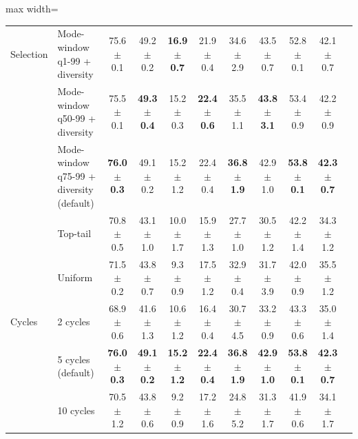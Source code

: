 \begin{table}[t]
\begin{adjustbox}{max width=\textwidth}
\begin{tabular}{l l c c c c c c c c c}
\midrule
Selection & Mode-window q1-99 + diversity & 75.6 {\scriptsize$\pm$ 0.1} & 49.2 {\scriptsize$\pm$ 0.2} & \textbf{16.9 {\scriptsize$\pm$ 0.7}} & 21.9 {\scriptsize$\pm$ 0.4} & 34.6 {\scriptsize$\pm$ 2.9} & 43.5 {\scriptsize$\pm$ 0.7} & 52.8 {\scriptsize$\pm$ 0.1} & 42.1 {\scriptsize$\pm$ 0.7} \\
 & Mode-window q50-99 + diversity & 75.5 {\scriptsize$\pm$ 0.1} & \textbf{49.3 {\scriptsize$\pm$ 0.4}} & 15.2 {\scriptsize$\pm$ 0.3} & \textbf{22.4 {\scriptsize$\pm$ 0.6}} & 35.5 {\scriptsize$\pm$ 1.1} & \textbf{43.8 {\scriptsize$\pm$ 3.1}} & 53.4 {\scriptsize$\pm$ 0.9} & 42.2 {\scriptsize$\pm$ 0.9} \\
 & \rowcolor{blue!10} Mode-window q75-99 + diversity (default) & \textbf{76.0 {\scriptsize$\pm$ 0.3}} & 49.1 {\scriptsize$\pm$ 0.2} & 15.2 {\scriptsize$\pm$ 1.2} & 22.4 {\scriptsize$\pm$ 0.4} & \textbf{36.8 {\scriptsize$\pm$ 1.9}} & 42.9 {\scriptsize$\pm$ 1.0} & \textbf{53.8 {\scriptsize$\pm$ 0.1}} & \textbf{42.3 {\scriptsize$\pm$ 0.7}} \\
 & Top-tail & 70.8 {\scriptsize$\pm$ 0.5} & 43.1 {\scriptsize$\pm$ 1.0} & 10.0 {\scriptsize$\pm$ 1.7} & 15.9 {\scriptsize$\pm$ 1.3} & 27.7 {\scriptsize$\pm$ 1.0} & 30.5 {\scriptsize$\pm$ 1.2} & 42.2 {\scriptsize$\pm$ 1.4} & 34.3 {\scriptsize$\pm$ 1.2} \\
 & Uniform & 71.5 {\scriptsize$\pm$ 0.2} & 43.8 {\scriptsize$\pm$ 0.7} & 9.3 {\scriptsize$\pm$ 0.9} & 17.5 {\scriptsize$\pm$ 1.2} & 32.9 {\scriptsize$\pm$ 0.4} & 31.7 {\scriptsize$\pm$ 3.9} & 42.0 {\scriptsize$\pm$ 0.9} & 35.5 {\scriptsize$\pm$ 1.2} \\
\midrule
Cycles & 2 cycles & 68.9 {\scriptsize$\pm$ 0.6} & 41.6 {\scriptsize$\pm$ 1.3} & 10.6 {\scriptsize$\pm$ 1.2} & 16.4 {\scriptsize$\pm$ 0.4} & 30.7 {\scriptsize$\pm$ 4.5} & 33.2 {\scriptsize$\pm$ 0.9} & 43.3 {\scriptsize$\pm$ 0.6} & 35.0 {\scriptsize$\pm$ 1.4} \\
 & \rowcolor{blue!10} 5 cycles (default) & \textbf{76.0 {\scriptsize$\pm$ 0.3}} & \textbf{49.1 {\scriptsize$\pm$ 0.2}} & \textbf{15.2 {\scriptsize$\pm$ 1.2}} & \textbf{22.4 {\scriptsize$\pm$ 0.4}} & \textbf{36.8 {\scriptsize$\pm$ 1.9}} & \textbf{42.9 {\scriptsize$\pm$ 1.0}} & \textbf{53.8 {\scriptsize$\pm$ 0.1}} & \textbf{42.3 {\scriptsize$\pm$ 0.7}} \\
 & 10 cycles & 70.5 {\scriptsize$\pm$ 1.2} & 43.8 {\scriptsize$\pm$ 0.6} & 9.2 {\scriptsize$\pm$ 0.9} & 17.2 {\scriptsize$\pm$ 1.6} & 24.8 {\scriptsize$\pm$ 5.2} & 31.3 {\scriptsize$\pm$ 1.7} & 41.9 {\scriptsize$\pm$ 0.6} & 34.1 {\scriptsize$\pm$ 1.7} \\

\end{tabular}
\end{adjustbox}
\end{table}
